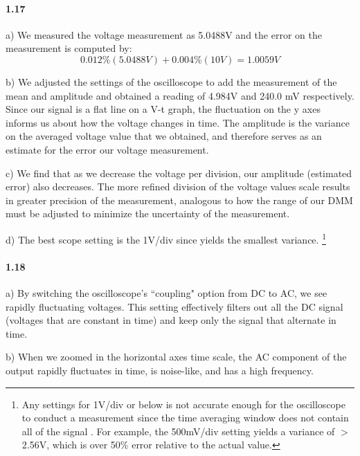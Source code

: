 \documentclass[authoryear, 12pt,5p, times]{elsarticle}
\begin{document}
\paragraph{\textbf{1.17}}
a) We measured the voltage measurement as 5.0488V and the error on the measurement is computed by: 
\begin{equation*}
0.012\%(5.0488V)+0.004\%(10V) = 1.0059V
\end{equation*}
\par b) We adjusted the settings of the oscilloscope to add the  measurement of the mean and amplitude and obtained a reading of 4.984V and 240.0 mV respectively. Since our signal is a flat line on a V-t graph, the fluctuation on the y axes informs us about how the voltage changes in time. The amplitude is the variance on the averaged voltage value that we obtained, and therefore serves as an estimate for the error our voltage measurement. 
\par
c) We find that as we decrease the voltage per division, our amplitude (estimated error) also decreases. The more refined division of the voltage values scale results in greater precision of the measurement, analogous to how the range of our DMM must be adjusted to minimize the uncertainty of the  measurement.
\par
d) The best scope setting is the 1V/div since yields the smallest variance. \footnote{Any settings for 1V/div  or below is not accurate enough  for the oscilloscope to conduct a measurement since the time averaging window does not contain all  of the signal . For example, the 500mV/div setting yields a variance of $>$2.56V, which is over 50\% error relative to the actual value.}

\paragraph{\textbf{1.18}} 
\par a) By switching the oscilloscope's ``coupling" option from DC to AC, we see rapidly fluctuating voltages. This setting effectively filters out all the DC signal (voltages that are constant in time) and keep only the signal that alternate in time. 
\par  b) When we zoomed in the horizontal axes time scale, the AC component of the output rapidly fluctuates in time, is noise-like, and has a high frequency. 
\end{document}
